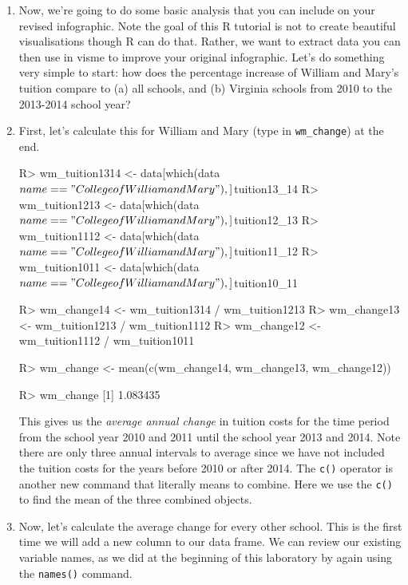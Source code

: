 \documentclass{article}
\newenvironment{Schunk}{}{}
\newcommand{\code}[1]{\texttt{#1}}
\newcommand{\proglang}[1]{\textsf{#1}}
\begin{document}
{\begin{enumerate}[leftmargin=15mm]
\item Now, we're going to do some basic analysis that you can include on your revised infographic.  Note the goal of this \proglang{R} tutorial is not to create beautiful visualisations though \proglang{R} can do that.  Rather, we want to extract data you can then use in visme to improve your original infographic.  Let's do something very simple to start: how does the percentage increase of William and Mary's tuition compare to (a) all schools, and (b) Virginia schools from 2010 to the 2013-2014 school year?

\item First, let's calculate this for William and Mary (type in \code{wm\_change}) at the end.

\begin{Schunk}
\begin{Sinput}

R> wm_tuition1314 <- data[which(data$name == "College of 
William and Mary"), ]$tuition13_14
R> wm_tuition1213 <- data[which(data$name == "College of 
William and Mary"), ]$tuition12_13
R> wm_tuition1112 <- data[which(data$name == "College of 
William and Mary"), ]$tuition11_12
R> wm_tuition1011 <- data[which(data$name == "College of 
William and Mary"), ]$tuition10_11

R> wm_change14 <- wm_tuition1314 / wm_tuition1213
R> wm_change13 <- wm_tuition1213 / wm_tuition1112
R> wm_change12 <- wm_tuition1112 / wm_tuition1011

R> wm_change <- mean(c(wm_change14, wm_change13, wm_change12))

R> wm_change
[1] 1.083435

\end{Sinput}
\end{Schunk}

This gives us the \textit{average annual change} in tuition costs for the time period from the school year 2010 and 2011 until the school year 2013 and 2014.  Note there are only three annual intervals to average since we have not included the tuition costs for the years before 2010 or after 2014.  The \code{c()} operator is another new command that literally means to combine.  Here we use the \code{c()} to find the mean of the three combined objects.

\item Now, let's calculate the average change for every other school.  This is the first time we will add a new column to our data frame.  We can review our existing variable names, as we did at the beginning of this laboratory by again using the \code{names()} command.


\end{enumerate}}
\end{document}

